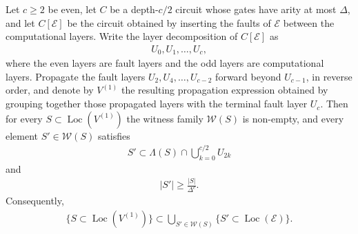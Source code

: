 \begin{claim}
  \label{claim:block_witness}
  Let $c\ge 2$ be even, let $C$ be a depth-$c/2$ circuit whose gates have arity at most $\Delta$, and let $C[\mathcal{E}]$ be the circuit obtained by inserting the faults of $\mathcal{E}$ between the computational layers. Write the layer decomposition of $C[\mathcal{E}]$ as
  \begin{equation*}
    \begin{split}
      U_{0},U_{1},\ldots,U_{c},
    \end{split}
  \end{equation*}
  where the even layers are fault layers and the odd layers are computational layers. Propagate the fault layers $U_{2},U_{4},\ldots,U_{c-2}$ forward beyond $U_{c-1}$, in reverse order, and denote by $V^{(1)}$ the resulting propagation expression obtained by grouping together those propagated layers with the terminal fault layer $U_{c}$. Then for every $S\subset \operatorname{Loc}(V^{(1)})$ the witness family $\mathcal{W}(S)$ is non-empty, and every element $S'\in \mathcal{W}(S)$ satisfies
  \begin{equation*}
    \begin{split}
      S'\subset \Lambda(S)\cap \bigcup_{k=0}^{c/2}U_{2k}
    \end{split}
  \end{equation*}
  and
  \begin{equation*}
    \begin{split}
      |S'|\ge \frac{|S|}{\Delta^{c}}.
    \end{split}
  \end{equation*}
  Consequently,
  \begin{equation*}
    \begin{split}
      \{S\subset \operatorname{Loc}(V^{(1)})\}
      \subset
      \bigcup_{S'\in \mathcal{W}(S)} \{S'\subset \operatorname{Loc}(\mathcal{E})\}.
    \end{split}
  \end{equation*}
\end{claim}
